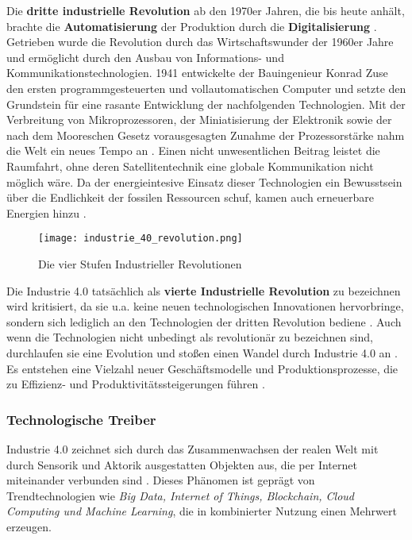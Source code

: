 Die \textbf{dritte industrielle Revolution} ab den 1970er Jahren, die bis heute anhält,  brachte die \textbf{Automatisierung} der Produktion durch die \textbf{Digitalisierung} \citep{Voigt2018}. Getrieben wurde die Revolution durch das Wirtschaftswunder der 1960er Jahre \citep{Roth2016} und ermöglicht durch den Ausbau von Informations- und Kommunikationstechnologien. 1941 entwickelte der Bauingenieur Konrad Zuse den ersten programmgesteuerten und vollautomatischen Computer und setzte den Grundstein für eine rasante Entwicklung der nachfolgenden Technologien. Mit der Verbreitung von Mikroprozessoren, der Miniatisierung der Elektronik sowie der nach dem Mooreschen Gesetz vorausgesagten Zunahme der Prozessorstärke nahm die Welt ein neues Tempo an \citep{Sendler2016}. Einen nicht unwesentlichen Beitrag leistet die Raumfahrt, ohne deren Satellitentechnik eine globale Kommunikation nicht möglich wäre. Da der energieintesive Einsatz dieser Technologien ein Bewusstsein über die Endlichkeit der fossilen Ressourcen schuf, kamen auch erneuerbare Energien hinzu \citep{Barthelmaes2017}.

\begin{figure}[ht]
  \centering
  \texttt{[image: industrie\_40\_revolution.png]}
  \caption[Die vier Stufen Industrieller Revolutionen]{Die vier Stufen Industrieller Revolutionen \citep[S. 9]{Bauer2014}}
  \label{fig:revolutions}
\end{figure}

Die Industrie 4.0 tatsächlich als \textbf{vierte Industrielle Revolution} zu bezeichnen wird kritisiert, da sie u.a. keine neuen technologischen Innovationen hervorbringe, sondern sich lediglich an den Technologien der dritten Revolution bediene \citep{Barthelmaes2017}. Auch wenn die Technologien nicht unbedingt als revolutionär zu bezeichnen sind, durchlaufen sie eine Evolution und stoßen einen Wandel durch Industrie 4.0 an \citep{Roth2016}. Es entstehen eine Vielzahl neuer Geschäftsmodelle und Produktionsprozesse, die zu Effizienz- und Produktivitätssteigerungen führen \citep{BITKOM2015}.


\subsubsection{Technologische Treiber}\label{technologien}

Industrie 4.0 zeichnet sich durch das Zusammenwachsen der realen Welt mit durch Sensorik und Aktorik ausgestatten Objekten aus, die per Internet miteinander verbunden sind \citep{BITKOM2015}. Dieses Phänomen ist geprägt von Trendtechnologien wie \textit{Big Data, Internet of Things, Blockchain, Cloud Computing und Machine Learning}, die in kombinierter Nutzung einen Mehrwert erzeugen.
